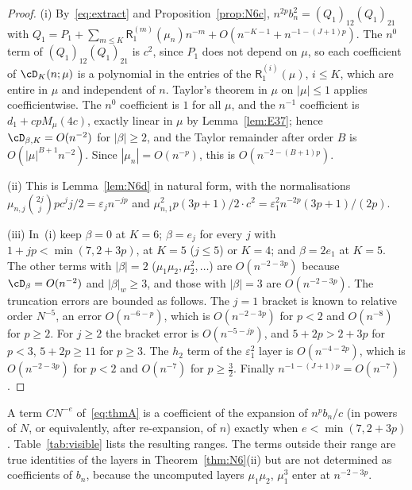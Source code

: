 \begin{proof}
(i) By~\eqref{eq:extract} and Proposition~\ref{prop:N6c}, $n^{2p}b_n^2=(Q_1)_{12}(Q_1)_{21}$ with
$Q_1=P_1+\sum_{m\le K}\mathsf R_1^{(m)}(\mu_n)n^{-m}+O(n^{-K-1}+n^{-1-(J+1)p})$. The $n^0$ term of $(Q_1)_{12}(Q_1)_{21}$ is
$c^2$, since $P_1$ does not depend on $\mu$, so each coefficient of $\cD_K(n;\mu)$ is a polynomial in the entries of the
$\mathsf R_1^{(i)}(\mu)$, $i\le K$, which are entire in $\mu$ and independent of $n$. Taylor's theorem in $\mu$ on $|\mu|\le1$
applies coefficientwise. The $n^0$ coefficient is $1$ for all $\mu$, and the $n^{-1}$ coefficient is $d_1+cpM_\mu(4c)$,
exactly linear in $\mu$ by Lemma~\ref{lem:E37}; hence $\cD_{\beta,K}=O(n^{-2})$ for $|\beta|\ge2$, and the Taylor remainder
after order $B$ is $O(|\mu|^{B+1}n^{-2})$. Since $|\mu_n|=O(n^{-p})$, this is $O(n^{-2-(B+1)p})$.

(ii) This is Lemma~\ref{lem:N6d} in natural form, with the normalisations
$\mu_{n,j}\binom{2j}jpc^jj/2=\varepsilon_jn^{-jp}$ and $\mu_{n,1}^2p(3p+1)/2\cdot c^2=\varepsilon_1^2n^{-2p}(3p+1)/(2p)$.

(iii) In~(i) keep $\beta=0$ at $K=6$; $\beta=e_j$ for every $j$ with $1+jp<\min(7,2+3p)$, at $K=5$ ($j\le5$) or $K=4$; and
$\beta=2e_1$ at $K=5$. The other terms with $|\beta|=2$ ($\mu_1\mu_2,\mu_2^2,\dots$) are $O(n^{-2-3p})$ because
$\cD_\beta=O(n^{-2})$ and $|\beta|_w\ge3$, and those with $|\beta|=3$ are $O(n^{-2-3p})$. The truncation errors are bounded as
follows. The $j=1$ bracket is known to relative order $N^{-5}$, an error $O(n^{-6-p})$, which is $O(n^{-2-3p})$ for $p<2$
and $O(n^{-8})$ for $p\ge2$. For $j\ge2$ the bracket error is $O(n^{-5-jp})$, and $5+2p>2+3p$ for $p<3$, $5+2p\ge11$ for
$p\ge3$. The $h_2$ term of the $\varepsilon_1^2$ layer is $O(n^{-4-2p})$, which is $O(n^{-2-3p})$ for $p<2$ and $O(n^{-7})$ for
$p\ge\frac32$. Finally $n^{-1-(J+1)p}=O(n^{-7})$.
\end{proof}

A term $CN^{-e}$ of~\eqref{eq:thmA} is a coefficient of the expansion of $n^pb_n/c$ (in powers of $N$, or equivalently,
after re-expansion, of $n$) exactly when $e<\min(7,2+3p)$. Table~\ref{tab:visible} lists the resulting ranges. The terms
outside their range are true identities of the layers in Theorem~\ref{thm:N6}(ii) but are not determined as coefficients
of $b_n$, because the uncomputed layers $\mu_1\mu_2$, $\mu_1^3$ enter at $n^{-2-3p}$.

